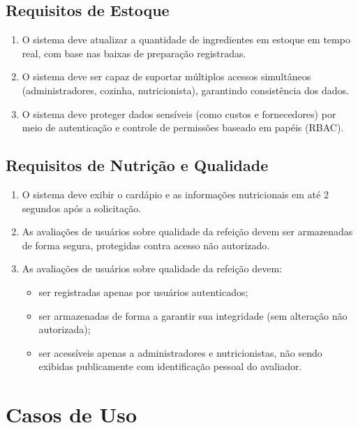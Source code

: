 \documentclass[12pt,a4paper]{article}
\begin{document}
\subsection{Requisitos de Estoque}
\begin{enumerate}[label=\textbf{RNF-EST-\arabic*}, leftmargin=*, align=left]
    \item O sistema deve atualizar a quantidade de ingredientes em estoque em tempo real, com base nas baixas de preparação registradas.
    \item O sistema deve ser capaz de suportar múltiplos acessos simultâneos (administradores, cozinha, nutricionista), garantindo consistência dos dados.
    \item O sistema deve proteger dados sensíveis (como custos e fornecedores) por meio de autenticação e controle de permissões baseado em papéis (RBAC).
\end{enumerate}

\subsection{Requisitos de Nutrição e Qualidade}
\begin{enumerate}[label=\textbf{RNF-NUT-\arabic*}, leftmargin=*, align=left]
    \item O sistema deve exibir o cardápio e as informações nutricionais em até 2 segundos após a solicitação.
    \item As avaliações de usuários sobre qualidade da refeição devem ser armazenadas de forma segura, protegidas contra acesso não autorizado.
\item As avaliações de usuários sobre qualidade da refeição devem:
\begin{itemize}
    \item ser registradas apenas por usuários autenticados;
    \item ser armazenadas de forma a garantir sua integridade (sem alteração não autorizada);
    \item ser acessíveis apenas a administradores e nutricionistas, não sendo exibidas publicamente com identificação pessoal do avaliador.
\end{itemize}

\end{enumerate}

\newpage
\section{Casos de Uso}
\end{document}
